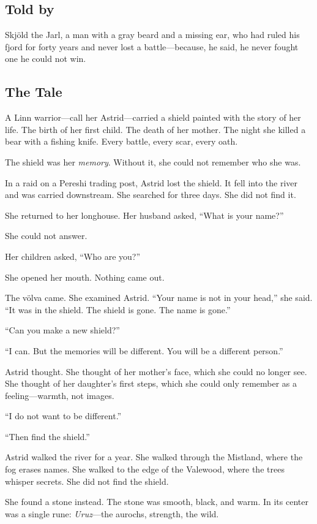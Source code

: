 \documentclass[9pt,a5paper]{extbook}
\begin{document}
\subsection*{Told by}

Skjöld the Jarl, a man with a gray beard and a missing ear, who had ruled his fjord for forty years and never lost a battle---because, he said, he never fought one he could not win.

\subsection*{The Tale}

A Linn warrior---call her Astrid---carried a shield painted with the story of her life. The birth of her first child. The death of her mother. The night she killed a bear with a fishing knife. Every battle, every scar, every oath.

The shield was her \textit{memory}. Without it, she could not remember who she was.

In a raid on a Pereshi trading post, Astrid lost the shield. It fell into the river and was carried downstream. She searched for three days. She did not find it.

She returned to her longhouse. Her husband asked, ``What is your name?''

She could not answer.

Her children asked, ``Who are you?''

She opened her mouth. Nothing came out.

The völva came. She examined Astrid. ``Your name is not in your head,'' she said. ``It was in the shield. The shield is gone. The name is gone.''

``Can you make a new shield?''

``I can. But the memories will be different. You will be a different person.''

Astrid thought. She thought of her mother's face, which she could no longer see. She thought of her daughter's first steps, which she could only remember as a feeling---warmth, not images.

``I do not want to be different.''

``Then find the shield.''

Astrid walked the river for a year. She walked through the Mistland, where the fog erases names. She walked to the edge of the Valewood, where the trees whisper secrets. She did not find the shield.

She found a stone instead. The stone was smooth, black, and warm. In its center was a single rune: \textit{Uruz}---the aurochs, strength, the wild.
\end{document}
